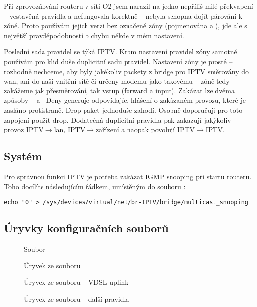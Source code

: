 Při zprovozňování routeru v síti O2 jsem narazil na jedno nepříliš milé
překvapení -- vestavěná pravidla  a 
nefungovala korektně -- nebyla schopna dojít párování k zóně. Proto používám
jejich verzi bez označené zóny (pojmenována  a
), jde ale s největší pravděpodobností o chybu
někde v mém nastavení.

Poslední sada pravidel se týká IPTV. Krom nastavení pravidel zóny samotné
používám pro klid duše duplicitní sadu pravidel. Nastavení zóny je prosté
-- rozhodně nechceme, aby byly jakékoliv packety z bridge pro IPTV směrovány
do wan, ani do naší vnitřní sítě či určeny modemu jako takovému -- zóně tedy
zakážeme jak přesměrování, tak vstup (forward a input). Zakázat lze dvěma
způsoby --  a . Deny generuje odpovídající hlášení o zakázaném
provozu, které je zasláno protistraně. Drop paket jednoduše zahodí. Osobně
doporučuji pro toto zapojení použít drop. Dodatečná duplicitní pravidla pak
zakazují jakýkoliv provoz IPTV$\rightarrow$lan, IPTV$\rightarrow$zařízení
a naopak povolují IPTV$\rightarrow$IPTV.

\subsection{Systém}
Pro správnou funkci IPTV je potřeba zakázat IGMP snooping při startu routeru.
Toho docílíte následujícím řádkem, umístěným do souboru :\\

\begin{lstlisting}
echo "0" > /sys/devices/virtual/net/br-IPTV/bridge/multicast_snooping
\end{lstlisting}

\subsection{Úryvky konfiguračních souborů}
\begin{figure}
	
	\caption{Soubor }
	\label{o2:frag:rclocal}
\end{figure}
\begin{figure}
	
	\caption{Úryvek ze souboru }
	\label{o2:frag:network}
\end{figure}
\begin{figure}
	
	\caption{Úryvek ze souboru  -- VDSL uplink}
	\label{o2:frag:firewall:vdsl}
\end{figure}
\begin{figure}
	
	\caption{Úryvek ze souboru  -- další pravidla}
	\label{o2:frag:firewall:iptv}
\end{figure}
